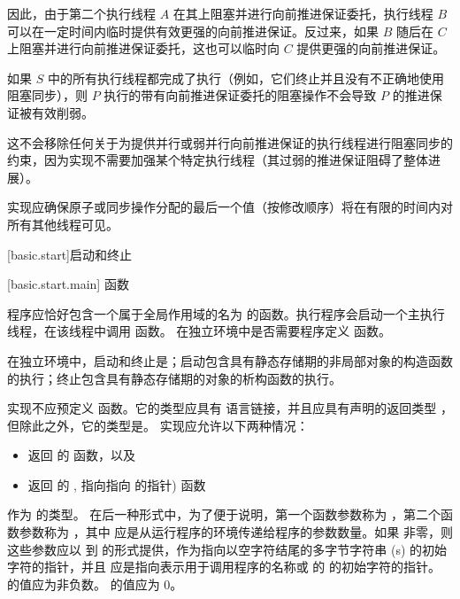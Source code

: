 \pnum
\begin{note}
因此，由于第二个执行线程 $A$ 在其上阻塞并进行向前推进保证委托，执行线程 $B$ 可以在一定时间内临时提供有效更强的向前推进保证。反过来，如果 $B$ 随后在 $C$ 上阻塞并进行向前推进保证委托，这也可以临时向 $C$ 提供更强的向前推进保证。
\end{note}

\pnum
\begin{note}
如果 $S$ 中的所有执行线程都完成了执行（例如，它们终止并且没有不正确地使用阻塞同步），则 $P$ 执行的带有向前推进保证委托的阻塞操作不会导致 $P$ 的推进保证被有效削弱。
\end{note}

\pnum
\begin{note}
这不会移除任何关于为提供并行或弱并行向前推进保证的执行线程进行阻塞同步的约束，因为实现不需要加强某个特定执行线程（其过弱的推进保证阻碍了整体进展）。
\end{note}

\pnum
实现应确保原子或同步操作分配的最后一个值（按修改顺序）将在有限的时间内对所有其他线程可见。%
%

[basic.start]{启动和终止}

[basic.start.main]{ 函数}

\pnum
{}%
程序应恰好包含一个属于全局作用域的名为  的函数。执行程序会启动一个主执行线程，在该线程中调用  函数。
%
在独立环境中是否需要程序定义  函数。
\begin{note}
在独立环境中，启动和终止是；启动包含具有静态存储期的非局部对象的构造函数的执行；终止包含具有静态存储期的对象的析构函数的执行。
\end{note}

\pnum
实现不应预定义  函数。它的类型应具有 \Cpp{} 语言链接，并且应具有声明的返回类型 ，但除此之外，它的类型是。
%
实现应允许以下两种情况：
\begin{itemize}
\item 返回  的 \tcode{()} 函数，以及
\item 返回  的 , 指向指向  的指针) 函数
\end{itemize}
%
%
作为  的类型。
%
%
在后一种形式中，为了便于说明，第一个函数参数称为 ，第二个函数参数称为 ，其中  应是从运行程序的环境传递给程序的参数数量。如果  非零，则这些参数应以  到  的形式提供，作为指向以空字符结尾的多字节字符串 (\ntmbs{}s) 的初始字符的指针，并且  应是指向表示用于调用程序的名称或  的 \ntmbs{} 的初始字符的指针。 的值应为非负数。 的值应为 0。

